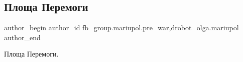  
 
 
 
 

\subsection{Площа Перемоги}
\label{sec:07_02_2023.fb.fb_group.mariupol.pre_war.4.ploshcha_peremogi}
 
\ifcmt
 author_begin
   author_id fb_group.mariupol.pre_war,drobot_olga.mariupol
 author_end
\fi

Площа Перемоги.

